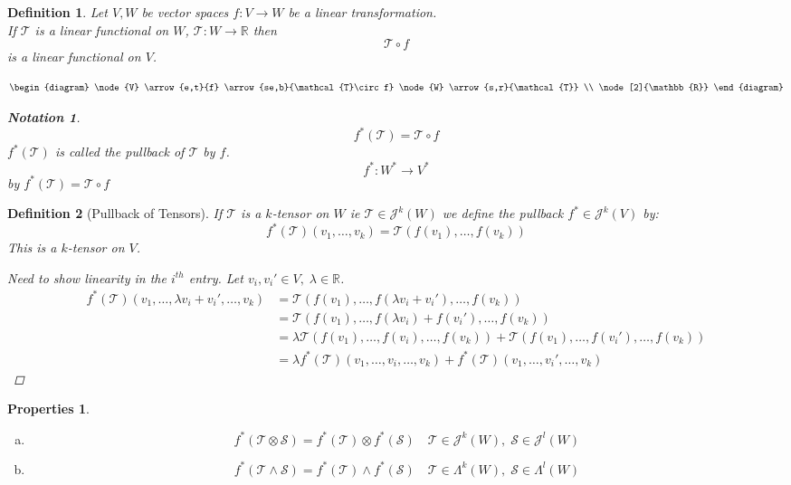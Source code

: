 \documentclass[12pt]{article}
\def\maj{\mathcal{J}}
\def\mat{\mathcal{T}}
\def\mas{\mathcal{S}}
\def\RR{\mathbb{R}}
\newtheorem{definition}{Definition}[section]
\newtheorem*{properties}{Properties}
\newtheorem*{notation}{Notation}
\begin{document}
\begin{definition}
Let $V,W$ be vector spaces $f:V\rightarrow W$ be a linear transformation. \\ If $\mat$ is a linear functional on $W$, $\mat : W\rightarrow \RR$ then \[\mat \circ f\] is a linear functional on $V$.

\[\begin{diagram}
\node{V} \arrow{e,t}{f}  \arrow{se,b}{\mat \circ f}
\node{W}  \arrow{s,r}{\mat} \\
 \node[2]{\RR}
\end{diagram}\]

\begin{notation}
\[f^{*}(\mat) = \mat \circ f\]
$f^{*}(\mat)$ is called the pullback of $\mat$ by $f$.
\[f^{*}:W^{*} \rightarrow V^{*}\]
by $f^{*}(\mat) = \mat \circ f$
\end{notation}

\end{definition}

\begin{definition}[Pullback of Tensors]
If $\mat$ is a $k$-tensor on $W$ ie $\mat \in \maj^k(W)$ we define the pullback $f^{*} \in \maj^k(V)$ by:
\[f^{*}(\mat)(v_1, \dots , v_k) = \mat(f(v_1), \dots , f(v_k))\]
This is a $k$-tensor on $V$.
\begin{proof}[Need to show linearity in the $i^{th}$ entry]
Let $v_i, v_i' \in V, \; \lambda \in \RR$.
\begin{align*}
f^{*}(\mat)(v_1,\dots,  \lambda v_i + v_i', \dots , v_k) &= \mat(f(v_1), \dots , f(\lambda v_i + v_i'), \dots , f(v_k))\\
&= \mat(f(v_1), \dots , f(\lambda v_i) + f(v_i'), \dots , f(v_k))\\
&= \lambda\mat(f(v_1), \dots , f( v_i), \dots , f(v_k))+ \mat(f(v_1), \dots , f(v_i'), \dots , f(v_k))\\
&=\lambda f^{*}(\mat)(v_1,\dots, v_i, \dots , v_k) + f^{*}(\mat)(v_1,\dots, v_i', \dots , v_k)
\end{align*}
\end{proof}
\end{definition}

\begin{properties}\quad\\
\begin{enumerate}[(a)]
\item \[ f^*(\mat \otimes \mas) = f^*(\mat)\otimes f^*(\mas) \quad \mat \in \maj^k(W), \; \mas \in \maj^l(W)\]
\item \[ f^*(\mat \wedge \mas) = f^*(\mat)\wedge f^*(\mas) \quad \mat \in \Lambda^k(W), \; \mas \in \Lambda^l(W)\]
\end{enumerate}
\end{properties}
\end{document}
